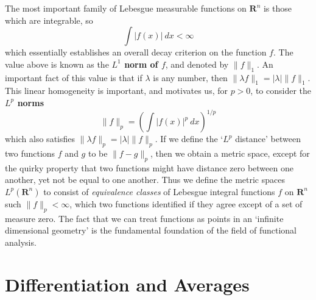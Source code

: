 The most important family of Lebesgue measurable functions on $\mathbf{R}^n$ is those which are integrable, so
%
\[ \int |f(x)|\ dx < \infty \]
%
which essentially establishes an overall decay criterion on the function $f$. The value above is known as the {\bf $L^1$ norm of $f$}, and denoted by $\| f \|_1$. An important fact of this value is that if $\lambda$ is any number, then $\| \lambda f \|_1 = |\lambda| \| f \|_1$. This linear homogeneity is important, and motivates us, for $p > 0$, to consider the {\bf $L^p$ norms}
%
\[ \| f \|_p = \left( \int |f(x)|^p\ dx \right)^{1/p} \]
%
which also satisfies $\| \lambda f \|_p = |\lambda| \| f \|_p$. If we define the `$L^p$ distance' between two functions $f$ and $g$ to be $\| f - g \|_p$, then we obtain a metric space, except for the quirky property that two functions might have distance zero between one another, yet not be equal to one another. Thus we define the metric spaces $L^p(\mathbf{R}^n)$ to consist of {\it equivalence classes} of Lebesgue integral functions $f$ on $\mathbf{R}^n$ such $\| f \|_p < \infty$, which two functions identified if they agree except of a set of measure zero. The fact that we can treat functions as points in an `infinite dimensional geometry' is the fundamental foundation of the field of functional analysis.


\chapter{Differentiation and Averages}

%
%

